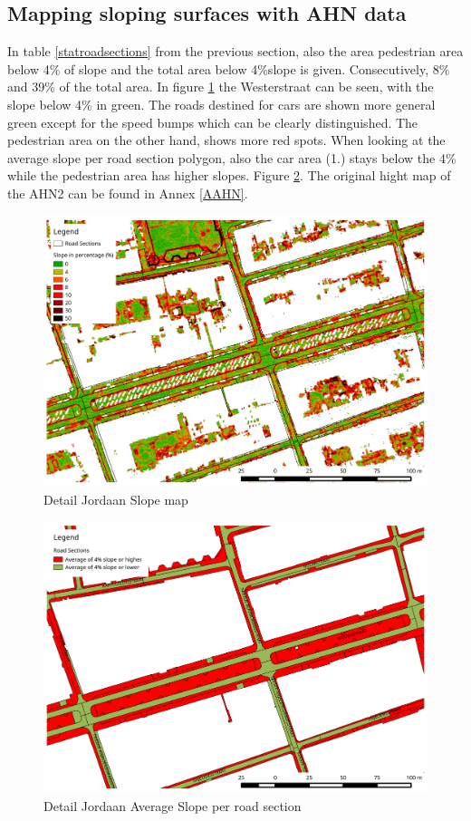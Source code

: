 \subsection{Mapping sloping surfaces with AHN data}
In table \ref{statroadsections} from the previous section, also the area pedestrian area below 4\% of slope and the total area below 4\%slope is given. Consecutively, 8\% and 39\% of the total area.
In figure \ref{jordaanslope} the Westerstraat can be seen, with the slope below 4\% in green. The roads destined for cars are shown more general green except for the speed bumps which can be clearly distinguished. The pedestrian area on the other hand, shows more red spots. When looking at the average slope per road section polygon, also the car area (1.) stays below the 4\% while the pedestrian area has higher slopes. Figure \ref{jordaanroadslope}.
The original hight map of the AHN2 can be found in Annex \ref{AAHN}.
\begin{figure}[h]
\includegraphics[width=\textwidth]{img/R_slope_jordaan.pdf}
\centering
\caption{
Detail Jordaan Slope map\label{jordaanslope}}
\end{figure} 

\begin{figure}[h]
\includegraphics[width=\textwidth]{img/R_averageslope_jordaan_roadsection.pdf}
\centering
\caption{
Detail Jordaan Average Slope per road section\label{jordaanroadslope}}
\end{figure} 
\clearpage



